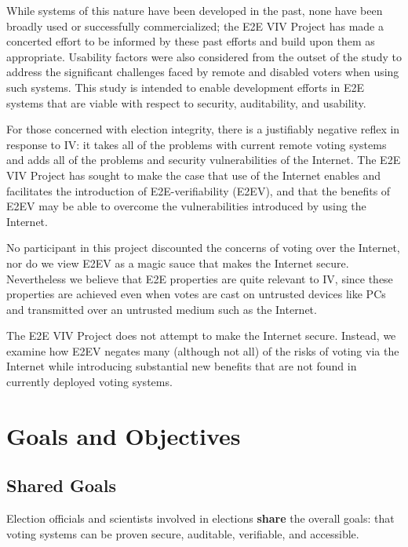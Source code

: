While systems of this nature have been developed in the past, none
have been broadly used or successfully commercialized; the E2E VIV
Project has made a concerted effort to be informed by these past
efforts and build upon them as appropriate. Usability factors were
also considered from the outset of the study to address the
significant challenges faced by remote and disabled voters when using
such systems. This study is intended to enable development efforts in
E2E systems that are viable with respect to security, auditability,
and usability.

For those concerned with election integrity, there is a justifiably
negative reflex in response to IV: it takes all of the problems with
current remote voting systems and adds all of the problems and
security vulnerabilities of the Internet. The E2E VIV Project has
sought to make the case that use of the Internet enables and
facilitates the introduction of E2E-verifiability (E2EV), and that the
benefits of E2EV may be able to overcome the vulnerabilities
introduced by using the Internet.

No participant in this project discounted the concerns of voting over
the Internet, nor do we view E2EV as a magic sauce that makes the
Internet secure. Nevertheless we believe that E2E properties are quite
relevant to IV, since these properties are achieved even when votes
are cast on untrusted devices like PCs and transmitted over an
untrusted medium such as the Internet.

The E2E VIV Project does not attempt to make the Internet
secure. Instead, we examine how E2EV negates many (although not all)
of the risks of voting via the Internet while introducing substantial
new benefits that are not found in currently deployed voting systems.

\section{Goals and Objectives}
\label{sec:goals-objectives}

\subsection{Shared Goals}
\label{sec:shared-goals}

Election officials and scientists involved in elections \textbf{share}
the overall goals: that voting systems can be proven secure,
auditable, verifiable, and accessible.

